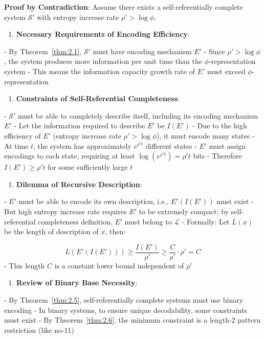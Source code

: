 \textbf{Proof by Contradiction}:
Assume there exists a self-referentially complete system $\mathcal{S}'$ with entropy increase rate $\rho' > \log \phi$.

\begin{enumerate}
\item \textbf{Necessary Requirements of Encoding Efficiency}:
\end{enumerate}
   - By Theorem~\ref{thm:2.1}, $\mathcal{S}'$ must have encoding mechanism $E'$
   - Since $\rho' > \log \phi$, the system produces more information per unit time than the $\phi$-representation system
   - This means the information capacity growth rate of $E'$ must exceed $\phi$-representation

\begin{enumerate}
\item \textbf{Constraints of Self-Referential Completeness}:
\end{enumerate}
   - $\mathcal{S}'$ must be able to completely describe itself, including its encoding mechanism $E'$
   - Let the information required to describe $E'$ be $I(E')$
   - Due to the high efficiency of $E'$ (entropy increase rate $\rho' > \log \phi$), it must encode many states
   - At time $t$, the system has approximately $e^{\rho' t}$ different states
   - $E'$ must assign encodings to each state, requiring at least $\log(e^{\rho' t}) = \rho' t$ bits
   - Therefore $I(E') \geq \rho' t$ for some sufficiently large $t$

\begin{enumerate}
\item \textbf{Dilemma of Recursive Description}:
\end{enumerate}
   - $E'$ must be able to encode its own description, i.e., $E'(I(E'))$ must exist
   - But high entropy increase rate requires $E'$ to be extremely compact; by self-referential completeness definition, $E'$ must belong to $\mathcal{L}$
   - Formally: Let $L(x)$ be the length of description of $x$, then:
     
\begin{equation}
L(E'(I(E'))) \geq \frac{I(E')}{\rho'} \geq \frac{C}{\rho'} \cdot \rho' = C
\end{equation}
   - This length $C$ is a constant lower bound independent of $\rho'$

\begin{enumerate}
\item \textbf{Review of Binary Base Necessity}:
\end{enumerate}
   - By Theorem~\ref{thm:2.5}, self-referentially complete systems must use binary encoding
   - In binary systems, to ensure unique decodability, some constraints must exist
   - By Theorem~\ref{thm:2.6}, the minimum constraint is a length-2 pattern restriction (like no-11)

